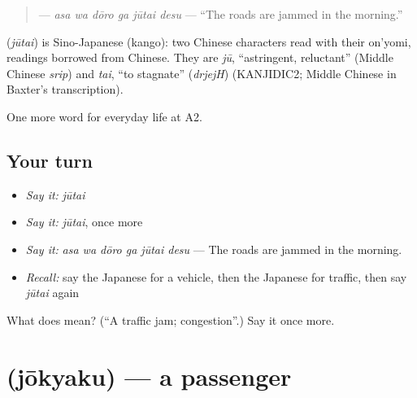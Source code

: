\begin{quote}
\textbf{  } — \emph{asa wa dōro ga jūtai desu} — \textquotedblleft{}The roads are jammed in the morning.\textquotedblright{}
\end{quote}

\begin{cousinweb}
\textbf{} (\emph{jūtai}) is Sino-Japanese (kango): two Chinese characters read with their on'yomi, readings borrowed from Chinese. They are \emph{jū}, \textquotedblleft{}astringent, reluctant\textquotedblright{} (Middle Chinese \emph{srip}) and \emph{tai}, \textquotedblleft{}to stagnate\textquotedblright{} (\emph{drjejH}) (KANJIDIC2; Middle Chinese in Baxter's transcription).
\end{cousinweb}

\begin{grammarlens}[title={What you've built}]
One more word for everyday life at A2.
\end{grammarlens}

\subsection*{Your turn}
\begin{itemize}
\raggedright
  \item \emph{Say it:} \emph{jūtai}
  \item \emph{Say it:} \emph{jūtai}, once more
  \item \emph{Say it:} \emph{asa wa dōro ga jūtai desu} — The roads are jammed in the morning.
  \item \emph{Recall:} say the Japanese for a vehicle, then the Japanese for traffic, then say \emph{jūtai} again
\end{itemize}

\begin{tcolorbox}[breakable,colback=teal!4,colframe=teal!35!black,title={Before you move on}]
What does  mean? (\textquotedblleft{}A traffic jam; congestion\textquotedblright{}.) Say it once more.
\end{tcolorbox}
\section[\texorpdfstring{\ja{じょうきゃく} (jōkyaku)}{じょうきゃく (jōkyaku)}]{ (jōkyaku) — a passenger}

\label{lesson:JA-C206-joukyaku}



